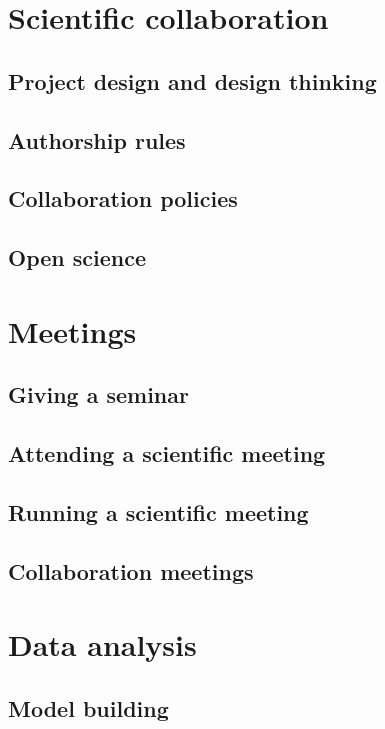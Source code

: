 \documentclass[letterpaper]{book}
\begin{document}
\part{Scientific collaboration}

\chapter{Project design and design thinking}

\chapter{Authorship rules}

\chapter{Collaboration policies}

\chapter{Open science}

\part{Meetings}

\chapter{Giving a seminar}

\chapter{Attending a scientific meeting}

\chapter{Running a scientific meeting}

\chapter{Collaboration meetings}

\part{Data analysis}

\chapter{Model building}
\end{document}
